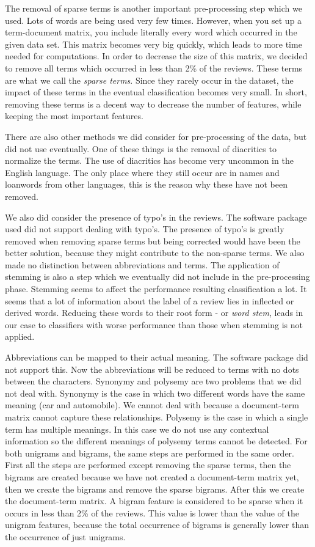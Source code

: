 \documentclass[a4paper,11pt]{article}
\begin{document}
The removal of sparse terms is another important pre-processing step which we used. Lots of words are being used very few times. However, when you set up a term-document matrix, you include literally every word which occurred in the given data set. This matrix becomes very big quickly, which leads to more time needed for computations. In order to decrease the size of this matrix, we decided to remove all terms which occurred in less than 2\% of the reviews. These terms are what we call the \textit{sparse terms}. Since they rarely occur in the dataset, the impact of these terms in the eventual classification becomes very small. In short, removing these terms is a decent way to decrease the number of features, while keeping the most important features.%

There are also other methods we did consider for pre-processing of the data, but did not use eventually. One of these things is the removal of diacritics to normalize the terms. The use of diacritics has become very uncommon in the English language. The only place where they still occur are in names and loanwords from other languages, this is the reason why these have not been removed. %

We also did consider the presence of typo's in the reviews. The software package used did not support dealing with typo's. The presence of typo's is greatly removed when removing sparse terms but being corrected would have been the better solution, because they might contribute to the non-sparse terms. We also made no distinction between abbreviations and terms.
The application of stemming is also a step which we eventually did not include in the pre-processing phase. Stemming seems to affect the performance resulting classification a lot. It seems that a lot of information about the label of a review lies in inflected or derived words. Reducing these words to their root form - or \textit{word stem}, leads in our case to classifiers with worse performance than those when stemming is not applied. %

Abbreviations can be mapped to their actual meaning. The software package did not support this. Now the abbreviations will be reduced to terms with no dots between the characters. Synonymy and polysemy are two problems that we did not deal with. Synonymy is the case in which two different words have the same meaning (car and automobile). We cannot deal with because a document-term matrix cannot capture these relationships. Polysemy is the case in which a single term has multiple meanings. In this case we do not use any contextual information so the different meanings of polysemy terms cannot be detected. For both unigrams and bigrams, the same steps are performed in the same order. First all the steps are performed except removing the sparse terms, then the bigrams are created because we have not created a document-term matrix yet, then we create the bigrams and remove the sparse bigrams. After this we create the document-term matrix. A bigram feature is considered to be sparse when it occurs in less than 2\% of the reviews. This value is lower than the value of the unigram features, because the total occurrence of bigrams is generally lower than the occurrence of just unigrams. %
\end{document}
